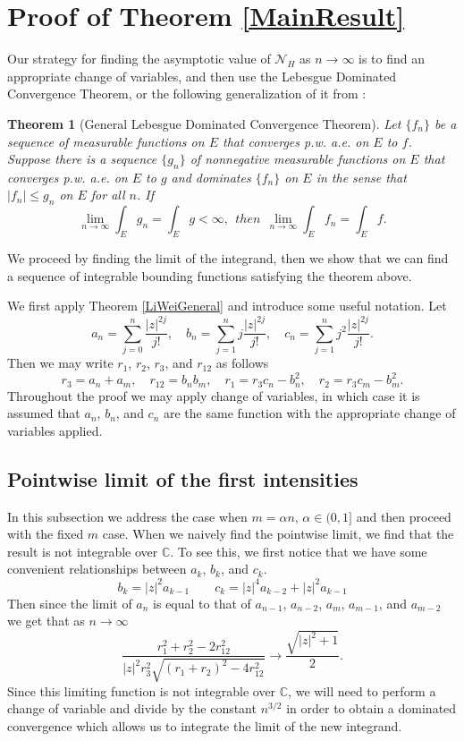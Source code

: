 \documentclass[12pt]{amsart}
\newtheorem{theorem}{Theorem}
\theoremstyle{remark}
\begin{document}
\section{Proof of Theorem \ref{MainResult}}
Our strategy for finding the asymptotic value of $\mathcal{N}_H$ as $n\rightarrow\infty$ is to find an appropriate change of variables, and then use the Lebesgue Dominated Convergence Theorem, or the following generalization of it from \cite[\S4.4]{Royden}:
\begin{theorem}[General Lebesgue Dominated Convergence Theorem]\label{GLDCT}
Let $\{f_n\}$ be a sequence of measurable functions on $E$ that converges p.w. a.e. on $E$ to $f$.  Suppose there is a sequence $\{g_n\}$ of nonnegative measurable functions on $E$ that converges p.w. a.e. on $E$ to $g$ and dominates $\{f_n\}$ on $E$ in the sense that $\lvert f_n\rvert\le g_n$ on $E$ for all $n$.  If 
\[\lim_{n\rightarrow\infty}\int_Eg_n=\int_Eg<\infty,\ \ then\ \ \lim_{n\rightarrow\infty}\int_Ef_n=\int_Ef.\]
\end{theorem}
We proceed by finding the limit of the integrand, then we show that we can find a sequence of integrable bounding functions satisfying the theorem above.

We first apply Theorem \ref{LiWeiGeneral} and introduce some useful notation.  Let
\[a_n=\sum_{j=0}^n\frac{\lvert z\rvert^{2j}}{j!},\quad b_n=\sum_{j=1}^nj\frac{\lvert z\rvert^{2j}}{j!},\quad c_n=\sum_{j=1}^nj^2\frac{\lvert z\rvert^{2j}}{j!}.\]
Then we may write $r_1$, $r_2$, $r_3$, and $r_{12}$ as follows
\begin{equation*}
r_3=a_n+a_m,\quad r_{12}=b_nb_m,\quad r_1=r_3c_n-b_n^2,\quad r_2=r_3c_m-b_m^2.
\end{equation*}
Throughout the proof we may apply change of variables, in which case it is assumed that $a_n$, $b_n$, and $c_n$ are the same function with the appropriate change of variables applied.
\subsection{Pointwise limit of the first intensities}
In this subsection we address the case when $m=\alpha n$, $\alpha\in(0,1]$ and then proceed with the fixed $m$ case.  When we naively find the pointwise limit, we find that the result is not integrable over $\mathbb{C}$.  To see this, we first notice that we have some convenient relationships between $a_k$, $b_k$, and $c_k$.
\begin{equation}\label{bkck}
b_k=\lvert z\rvert^2a_{k-1}\qquad c_k=\lvert z\rvert^4a_{k-2}+\lvert z\rvert^2a_{k-1}
\end{equation}
Then since the limit of $a_n$ is equal to that of $a_{n-1}$, $a_{n-2}$, $a_m$, $a_{m-1}$, and $a_{m-2}$ we get that as $n\rightarrow\infty$
\begin{equation}
\frac{r_1^2+r_2^2-2r_{12}^2}{\lvert z\rvert^2r_3^2\sqrt{(r_1+r_2)^2-4r_{12}^2}}\rightarrow\frac{\sqrt{\lvert z\rvert^2+1}}{2}.
\end{equation}
Since this limiting function is not integrable over $\mathbb{C}$, we will need to perform a change of variable and divide by the constant $n^{3/2}$ in order to obtain a dominated convergence which allows us to integrate the limit of the new integrand.
\end{document}

